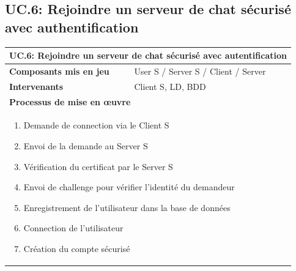 \documentclass[a4paper,11pt,french]{article}
\begin{document}
\subsection{UC.6: Rejoindre un serveur de chat sécurisé avec authentification}
\begin{center}
	\vspace*{0.7cm}
	\begin{tabularx}{16cm}{|l|X|}
	\hline
	\multicolumn{2}{|l|}{\textbf{UC.6: Rejoindre un serveur de chat sécurisé avec autentification}}\\
	\hline
	\textbf{Composants mis en jeu} & User S / Server S / Client / Server \\
	\hline
	\textbf{Intervenants} & Client S, LD, BDD \\
	\hline
	\multicolumn{2}{|l|}{\textbf{Processus de mise en \oe uvre}}\\
	\hline
	\multicolumn{2}{|p{15cm}|}{\begin{enumerate}\item Demande de connection via le Client S \item Envoi de la demande au Server S \item Vérification du certificat par le Server S \item Envoi de challenge pour vérifier l'identité du demandeur \item Enregistrement de l'utilisateur dans la base de données \item Connection de l'utilisateur \item Création du compte sécurisé \end{enumerate}}\\
	\hline
	\end{tabularx}
\end{center}
\end{document}
